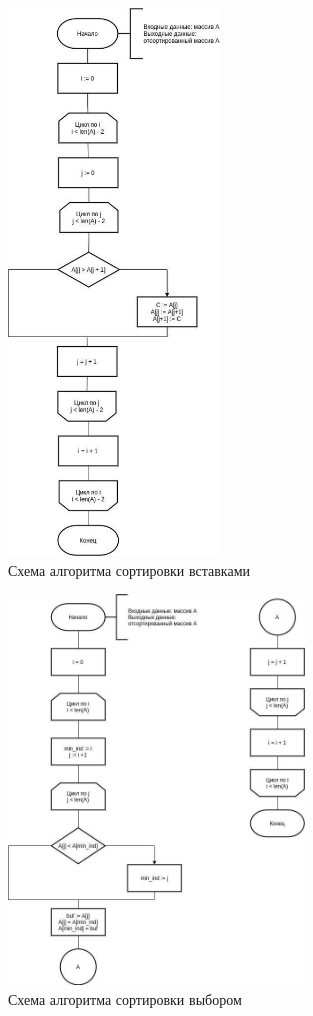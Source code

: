 \begin{figure}[h]
    \centering
    \includegraphics[width=0.5\textwidth]{img/flowcharts/insert.jpg}
    \caption{Схема алгоритма сортировки вставками}
    \label{fig:scheme_insert}
\end{figure} 


\begin{figure}[h]
    \centering
    \includegraphics[width=0.7\textwidth]{img/flowcharts/select.jpg}
    \caption{Схема алгоритма сортировки выбором}
    \label{fig:scheme_select}
\end{figure} 

